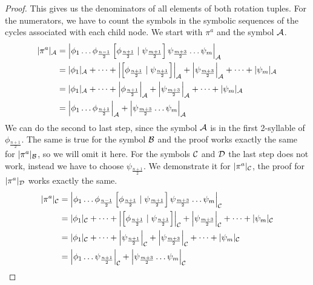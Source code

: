 \begin{proof}
	This gives us the denominators of all elements of both rotation tuples.
	For the numerators, we have to count the symbols in the symbolic sequences of the cycles associated with each child node.
	We start with $\pi^a$ and the symbol $\mathcal{A}$.
	\begin{align*}
		|\pi^a|_{\mathcal{A}} & = \left|\phi_1 \dots \phi_{\frac{n-1}{2}} \left[\phi_{\frac{n+1}{2}} \mid \psi_{\frac{m+1}{2}}\right] \psi_{\frac{m+3}{2}} \dots \psi_m\right|_{\mathcal{A}}                \\
		           & = |\phi_1|_{\mathcal{A}} + \dots + \left|\left[\phi_{\frac{n+1}{2}} \mid \psi_{\frac{n+1}{2}}\right]\right|_{\mathcal{A}} + \left|\psi_{\frac{m+3}{2}}\right|_{\mathcal{A}} + \dots + |\psi_m|_{\mathcal{A}} \\
		           & = |\phi_1|_{\mathcal{A}} + \dots + \left|\phi_{\frac{n+1}{2}}\right|_{\mathcal{A}} + \left|\psi_{\frac{m+3}{2}}\right|_{\mathcal{A}} + \dots + |\psi_m|_{\mathcal{A}}                                        \\
		           & = \left|\phi_1 \dots \phi_{\frac{n+1}{2}}\right|_{\mathcal{A}} + \left|\psi_{\frac{m+3}{2}} \dots \psi_m\right|_{\mathcal{A}}
	\end{align*}
	We can do the second to last step, since the symbol $\mathcal{A}$ is in the first 2-syllable of $\phi_{\frac{n+1}{2}}$.
	The same is true for the symbol $\mathcal{B}$ and the proof works exactly the same for $|\pi^a|_{\mathcal{B}}$, so we will omit it here.
	For the symbols $\mathcal{C}$ and $\mathcal{D}$ the last step does not work, instead we have to choose $\psi_{\frac{n+1}{2}}$.
	We demonstrate it for $|\pi^a|_{\mathcal{C}}$, the proof for $|\pi^a|_{\mathcal{D}}$ works exactly the same.
	\begin{align*}
		|\pi^a|_{\mathcal{C}} & = \left|\phi_1 \dots \phi_{\frac{n-1}{2}} \left[\phi_{\frac{n+1}{2}} \mid \psi_{\frac{m+1}{2}}\right] \psi_{\frac{m+3}{2}} \dots \psi_m\right|_{\mathcal{C}}                \\
		           & = |\phi_1|_{\mathcal{C}} + \dots + \left|\left[\phi_{\frac{n+1}{2}} \mid \psi_{\frac{n+1}{2}}\right]\right|_{\mathcal{C}} + \left|\psi_{\frac{m+3}{2}}\right|_{\mathcal{C}} + \dots + |\psi_m|_{\mathcal{C}} \\
		           & = |\phi_1|_{\mathcal{C}} + \dots + \left|\psi_{\frac{n+1}{2}}\right|_{\mathcal{C}} + \left|\psi_{\frac{m+3}{2}}\right|_{\mathcal{C}} + \dots + |\psi_m|_{\mathcal{C}}                                        \\
		           & = \left|\phi_1 \dots \psi_{\frac{n+1}{2}}\right|_{\mathcal{C}} + \left|\psi_{\frac{m+3}{2}} \dots \psi_m\right|_{\mathcal{C}}
	\end{align*}


\end{proof}
